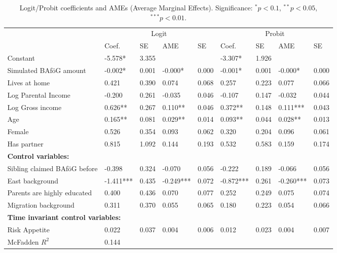 \begin{table}
\renewcommand{\arraystretch}{1.25}
\footnotesize
\label{tab:logit-probit-ame}
\begin{tabular}{lllllllll}
\toprule
 & \multicolumn{4}{c}{Logit} & \multicolumn{4}{c}{Probit} \\ 
\cmidrule(lr){2-5} \cmidrule(lr){6-9}
 & Coef. & SE & AME & SE & Coef. & SE & AME & SE \\
 \midrule
Constant                      & -5.578*     & 3.355    &            &       & -3.307*   & 1.926    &            &  \\
Simulated BAföG amount        & -0.002*     & 0.001    & -0.000*    & 0.000 & -0.001*   & 0.001    & -0.000*    & 0.000 \\
Lives at home                 & 0.421       & 0.390    & 0.074      & 0.068 & 0.257     & 0.223    & 0.077      & 0.066 \\
Log Parental Income           & -0.200      & 0.261    & -0.035     & 0.046 & -0.107    & 0.147    & -0.032     & 0.044 \\
Log Gross income              & 0.626**     & 0.267    & 0.110**    & 0.046 & 0.372**   & 0.148    & 0.111***   & 0.043 \\
Age                           & 0.165**     & 0.081    & 0.029**    & 0.014 & 0.093**   & 0.044    & 0.028**    & 0.013 \\
Female                        & 0.526       & 0.354    & 0.093      & 0.062 & 0.320     & 0.204    & 0.096      & 0.061 \\
Has partner                   & 0.815       & 1.092    & 0.144      & 0.193 & 0.532     & 0.583    & 0.159      & 0.174 \\
\midrule
\multicolumn{9}{l}{\textbf{Control variables:}} \\
Sibling claimed BAföG before  & -0.398      & 0.324    & -0.070     & 0.056 & -0.222    & 0.189    & -0.066     & 0.056 \\
East background               & -1.411***   & 0.435    & -0.249***  & 0.072 & -0.872*** & 0.261    & -0.260***  & 0.073 \\
Parents are highly educated   & 0.400       & 0.436    & 0.070      & 0.077 & 0.252     & 0.249    & 0.075      & 0.074 \\
Migration background          & 0.311       & 0.370    & 0.055      & 0.065 & 0.180     & 0.223    & 0.054      & 0.066 \\
\midrule
\multicolumn{9}{l}{\textbf{Time invariant control variables:}} \\
Risk Appetite                 & 0.022       & 0.037    & 0.004 & 0.006 & 0.012 & 0.023  & 0.004     & 0.007 \\
\midrule 
McFadden \( R^2 \) & 0.144 \\
\bottomrule
\end{tabular}
\caption{Logit/Probit coefficients and AMEs (Average Marginal Effects). Significance: $^{*} p < 0.1$, $^{**} p < 0.05$, $^{***} p < 0.01$.}
\end{table}


